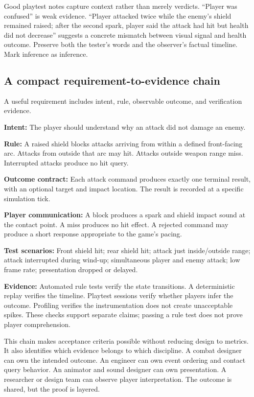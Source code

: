 Good playtest notes capture context rather than merely verdicts. ``Player was confused'' is weak evidence. ``Player attacked twice while the enemy's shield remained raised; after the second spark, player said the attack had hit but health did not decrease'' suggests a concrete mismatch between visual signal and health outcome. Preserve both the tester's words and the observer's factual timeline. Mark inference as inference.

\subsection{A compact requirement-to-evidence chain}\label{06-engine-ii-ch041-a-compact-requirement-to-evidence-chain}

A useful requirement includes intent, rule, observable outcome, and verification evidence.

\textbf{Intent:} The player should understand why an attack did not damage an enemy.

\textbf{Rule:} A raised shield blocks attacks arriving from within a defined front-facing arc. Attacks from outside that arc may hit. Attacks outside weapon range miss. Interrupted attacks produce no hit query.

\textbf{Outcome contract:} Each attack command produces exactly one terminal result, with an optional target and impact location. The result is recorded at a specific simulation tick.

\textbf{Player communication:} A block produces a spark and shield impact sound at the contact point. A miss produces no hit effect. A rejected command may produce a short response appropriate to the game's pacing.

\textbf{Test scenarios:} Front shield hit; rear shield hit; attack just inside/outside range; attack interrupted during wind-up; simultaneous player and enemy attack; low frame rate; presentation dropped or delayed.

\textbf{Evidence:} Automated rule tests verify the state transitions. A deterministic replay verifies the timeline. Playtest sessions verify whether players infer the outcome. Profiling verifies the instrumentation does not create unacceptable spikes. These checks support separate claims; passing a rule test does not prove player comprehension.

This chain makes acceptance criteria possible without reducing design to metrics. It also identifies which evidence belongs to which discipline. A combat designer can own the intended outcome. An engineer can own event ordering and contact query behavior. An animator and sound designer can own presentation. A researcher or design team can observe player interpretation. The outcome is shared, but the proof is layered.

